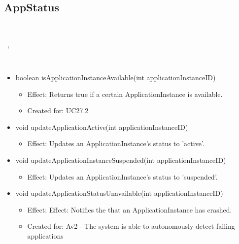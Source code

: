   \subsection{AppStatus}\label{int:OnlineServiceOnlineServiceApplicationManagerApplicationContainerMonitorAppStatus}
    \begin{description}
      \item[Provided by:] \iconcomponent{}~
      \item[Required by:] \iconcomponent{}~, \iconcomponent{}~
      \item[Operations:] ~
    \begin{itemize}[noitemsep,nolistsep,leftmargin=-.25cm]
      \item \textsf{boolean isApplicationInstanceAvailable(int applicationInstanceID)}
        \begin{itemize}[noitemsep,nolistsep]
           \item Effect: Returns true if a certain ApplicationInstance is available.
\item Created for: UC27.2
        \end{itemize}
      \item \textsf{void updateApplicationActive(int applicationInstanceID)}
        \begin{itemize}[noitemsep,nolistsep]
           \item Effect: Updates an ApplicationInstance's status to 'active'.
        \end{itemize}
      \item \textsf{void updateApplicationInstanceSuspended(int applicationInstanceID)}
        \begin{itemize}[noitemsep,nolistsep]
           \item Effect: Updates an ApplicationInstance's status to 'suspended'.
        \end{itemize}
      \item \textsf{void updateApplicationStatusUnavailable(int applicationInstanceID)}
        \begin{itemize}[noitemsep,nolistsep]
           \item Effect: Effect: Notifies the  that an ApplicationInstance has crashed.
\item Created for: Av2 - The system is able to autonomously detect failing applications
        \end{itemize}
    \end{itemize}
    \end{description}

